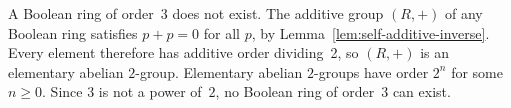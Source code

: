 %
%


\begin{remark*}
A Boolean ring of order~3 does not exist.
The additive group $(R,+)$ of any Boolean ring satisfies
$p + p = 0$ for all $p$, by Lemma~\ref{lem:self-additive-inverse}.
Every element therefore has additive order dividing~2, so
$(R,+)$ is an elementary abelian $2$-group.
Elementary abelian $2$-groups have order $2^n$ for some $n \ge 0$.
Since $3$ is not a power of~$2$, no Boolean ring of order~$3$
can exist.
\end{remark*}


